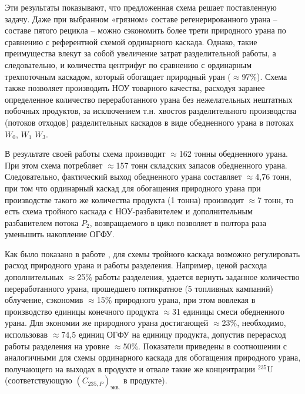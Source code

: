 Эти результаты показывают, что предложенная схема решает поставленную задачу. Даже при выбранном «грязном» составе регенерированного урана -- составе пятого рецикла -- можно сэкономить более трети природного урана  по сравнению с референтной схемой ординарного каскада. Однако, такие преимущества влекут за собой увеличение затрат разделительной работы, а следовательно, и количества центрифуг по сравнению с ординарным трехпоточным каскадом, который обогащает природный уран ($\approx$97\%). Схема также позволяет производить НОУ товарного качества, расходуя заранее определенное количество переработанного урана без нежелательных нештатных побочных продуктов, за исключением т.н. хвостов разделительного производства (потоков отходов) разделительных каскадов в виде обедненного урана в потоках $W_0$, $W_1$ $W_3$.

В результате своей работы схема производит $\approx$162 тонны обедненного урана. При этом схема потребляет $\approx$157 тонн складских запасов обедненного урана. Следовательно, фактический выход обедненного урана составляет $\approx$4,76 тонн, при том что ординарный каскад для обогащения природного урана при производстве такого же количества продукта (1 тонна) производит $\approx$7 тонн, то есть схема тройного каскада с НОУ-разбавителем и дополнительным разбавителем потока $P_2$, возвращаемого в цикл позволяет в полтора раза уменьшить накопление ОГФУ.


Как было показано в работе \cite{gusevMultycascadeEnrichmentSchemes2020}, для схемы тройного каскада возможно регулировать расход природного урана и работы разделения. Например, ценой расхода дополнительных $\approx$25\% работы разделения, удается вернуть заданное количество переработанного урана, прошедшего пятикратное (5 топливных кампаний) облучение, сэкономив $\approx$15\% природного урана, при этом вовлекая в производство единицы конечного продукта $\approx$31 единицы смеси обедненного урана. Для экономии же природного урана достигающей $\approx$23\%, необходимо, использовав $\approx$74,5 единиц ОГФУ на единицу продукта, допустив перерасход работы разделения на  уровне $\approx$50\%. Показатели приведены в соотношении с аналогичными для схемы ординарного каскада для обогащения природного урана, получающего на выходах в продукте и отвале такие же концентрации $^{235}$U (соответствующую $(C_{235,P})_\textit{экв.}$ в продукте).










